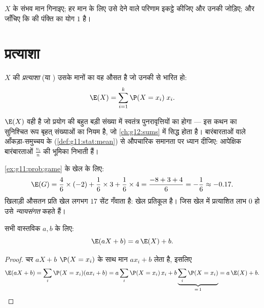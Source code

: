 \begin{method}[बंटन-सारणी बनाना]\label{met:g11:prob:table}
$X$ के संभव मान गिनाइए; हर मान के लिए उसे देने वाले परिणाम इकट्ठे कीजिए और
उनकी  जोड़िए; और जाँचिए कि  की पंक्ति का योग $1$ है।
\end{method}

\section{प्रत्याशा}

\begin{definition}[प्रत्याशा]\label{def:g11:prob:expectation}
$X$ की \emph{प्रत्याशा} (या ) उसके मानों का वह औसत है
जो उनकी  से भारित हो:
\[
\E(X) = \sum_{i=1}^{k} \P(X = x_i)\; x_i .
\]
\end{definition}

\begin{remark}
$\E(X)$ वही है जो प्रयोग की बहुत बड़ी संख्या में स्वतंत्र पुनरावृत्तियों का
 होगा --- इस कथन का सुनिश्चित रूप बृहत् संख्याओं का नियम है, जो \cref{ch:g12:sums} में
सिद्ध होता है। बारंबारताओं वाले आँकड़ा-समुच्चय के  (\cref{def:g11:stat:mean}) से औपचारिक
समानता पर ध्यान दीजिए:  आपेक्षिक बारंबारताओं $\frac{n_i}{n}$ की भूमिका
निभाती हैं।
\end{remark}

\begin{example}\label{ex:g11:prob:gameexp}
\cref{ex:g11:prob:game} के खेल के लिए:
\[
\E(G) = \frac46 \times (-2) + \frac16 \times 3 + \frac16 \times 4
= \frac{-8 + 3 + 4}{6} = -\frac16 \approx -0.17 .
\]
खिलाड़ी औसतन प्रति खेल लगभग $17$ सेंट गँवाता है: खेल प्रतिकूल है। जिस खेल
में प्रत्याशित लाभ $0$ हो उसे \emph{न्यायसंगत} कहते हैं।
\end{example}

\begin{proposition}[रैखिकता]\label{prop:g11:prob:linearity}
सभी वास्तविक $a, b$ के लिए:
\[
\E(aX + b) = a\,\E(X) + b .
\]
\end{proposition}

\begin{proof}
चर $aX + b$  $\P(X = x_i)$ के साथ मान $a x_i + b$ लेता है, इसलिए
\[
\E(aX + b) = \sum_i \P(X = x_i)(a x_i + b)
= a \sum_i \P(X = x_i)\,x_i + b \underbrace{\sum_i \P(X =
x_i)}_{=\,1} = a\,\E(X) + b .
\]
\end{proof}

